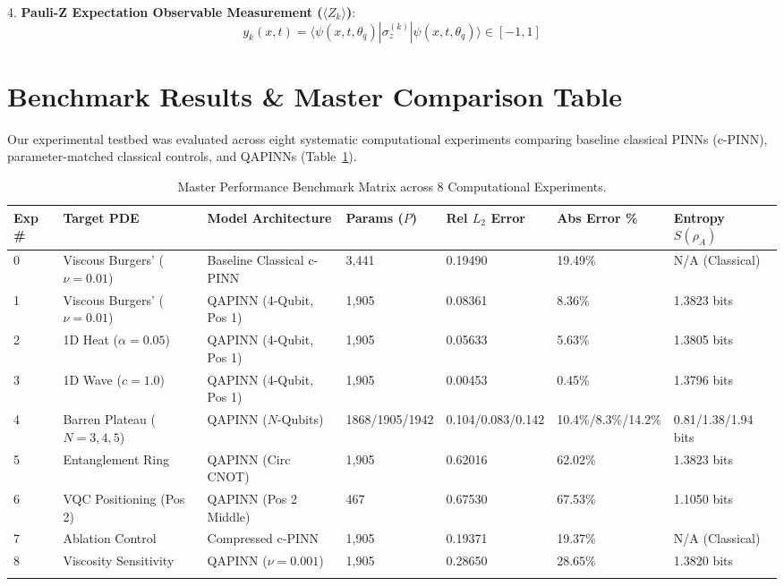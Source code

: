 \documentclass[pdflatex,sn-jnl]{sn-jnl}%
\begin{document}
4. \textbf{Pauli-Z Expectation Observable Measurement ($\langle Z_k \rangle$)}:
\begin{equation}\label{eq:measurement}
y_k(x,t) = \langle \psi(x,t,\theta_q) | \sigma_z^{(k)} | \psi(x,t,\theta_q) \rangle \in [-1, 1]
\end{equation}

\section{Benchmark Results \& Master Comparison Table}\label{sec5}
Our experimental testbed was evaluated across eight systematic computational experiments comparing baseline classical PINNs (c-PINN), parameter-matched classical controls, and QAPINNs (Table~\ref{tab:master_results}).

\begin{table}[h]
\caption{Master Performance Benchmark Matrix across 8 Computational Experiments.}\label{tab:master_results}
\begin{tabular}{@{}lllllll@{}}
\toprule
Exp \# & Target PDE & Model Architecture & Params ($P$) & Rel $L_2$ Error & Abs Error \% & Entropy $S(\rho_A)$ \\
\midrule
0 & Viscous Burgers' ($\nu=0.01$) & Baseline Classical c-PINN & 3,441 & 0.19490 & 19.49\% & N/A (Classical) \\
1 & Viscous Burgers' ($\nu=0.01$) & QAPINN (4-Qubit, Pos 1) & 1,905 & 0.08361 & 8.36\% & 1.3823 bits \\
2 & 1D Heat ($\alpha=0.05$) & QAPINN (4-Qubit, Pos 1) & 1,905 & 0.05633 & 5.63\% & 1.3805 bits \\
3 & 1D Wave ($c=1.0$) & QAPINN (4-Qubit, Pos 1) & 1,905 & 0.00453 & 0.45\% & 1.3796 bits \\
4 & Barren Plateau ($N=3,4,5$) & QAPINN ($N$-Qubits) & 1868/1905/1942 & 0.104/0.083/0.142 & 10.4\%/8.3\%/14.2\% & 0.81/1.38/1.94 bits \\
5 & Entanglement Ring & QAPINN (Circ CNOT) & 1,905 & 0.62016 & 62.02\% & 1.3823 bits \\
6 & VQC Positioning (Pos 2) & QAPINN (Pos 2 Middle) & 467 & 0.67530 & 67.53\% & 1.1050 bits \\
7 & Ablation Control & Compressed c-PINN & 1,905 & 0.19371 & 19.37\% & N/A (Classical) \\
8 & Viscosity Sensitivity & QAPINN ($\nu=0.001$) & 1,905 & 0.28650 & 28.65\% & 1.3820 bits \\
\botrule
\end{tabular}
\end{table}
\end{document}
